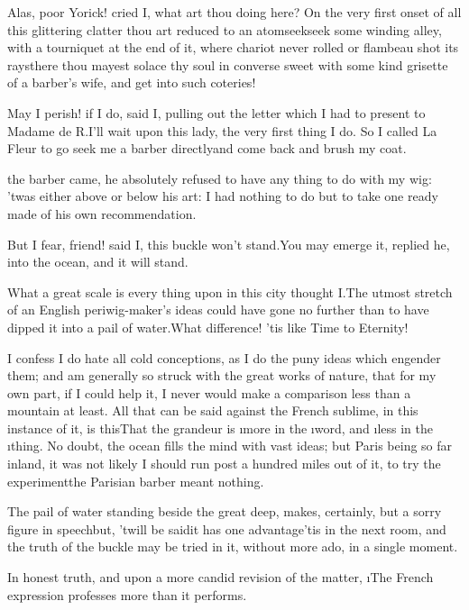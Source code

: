 \documentclass[twoside]{article}
\begin{document}
Alas, poor Yorick! cried I, what art thou doing here?  On the very first
onset of all this glittering clatter thou art reduced to an
atom\tsk seek\tsk seek some winding alley, with a tourniquet at the end of it,
where chariot never rolled or flambeau shot its rays\tsk there thou mayest
solace thy soul in converse sweet with some kind grisette of a barber’s
wife, and get into such coteries!\tsk 

\tsk May I perish! if I do, said I, pulling out the letter which I had to
present to Madame de R\astiii .\tsk I’ll wait upon this lady, the very first thing I
do.  So I called La Fleur to go seek me a barber directly\tsk and come back
and brush my coat.






 the barber came, he absolutely refused to have any thing to do with
my wig: ’twas either above or below his art: I had nothing to do but to
take one ready made of his own recommendation.

\tsk But I fear, friend! said I, this buckle won’t stand.\tsk You may emerge it,
replied he, into the ocean, and it will stand.\tsk 

What a great scale is every thing upon in this city thought I.\tsk The utmost
stretch of an English periwig-maker’s ideas could have gone no further
than to have \lqq dipped it into a pail of water.\rqq\tsk What difference! ’tis like
Time to Eternity!

I confess I do hate all cold conceptions, as I do the puny ideas which
engender them; and am generally so struck with the great works of nature,
that for my own part, if I could help it, I never would make a comparison
less than a mountain at least.  All that can be said against the French
sublime, in this instance of it, is this\tsk That the grandeur is \i{more} in
the \i{word}, and \i{less} in the \i{thing}.  No doubt, the ocean fills the
mind with vast ideas; but Paris being so far inland, it was not likely I
should run post a hundred miles out of it, to try the experiment\tsk the
Parisian barber meant nothing.\tsk 

The pail of water standing beside the great deep, makes, certainly, but a
sorry figure in speech\tsk but, ’twill be said\tsk it has one advantage\tsk ’tis in
the next room, and the truth of the buckle may be tried in it, without
more ado, in a single moment.

In honest truth, and upon a more candid revision of the matter, \i{The
French expression professes more than it performs}.
\end{document}
